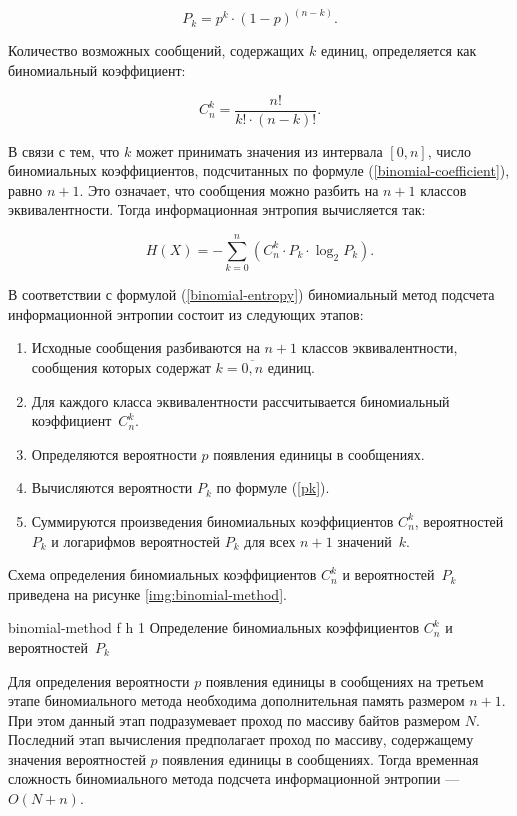 \begin{equation}\label{pk}
	P_{k} = p^k \cdot (1 - p)^{(n - k)}.
\end{equation} 

Количество возможных сообщений, содержащих $k$ единиц, определяется как биномиальный коэффициент:

\begin{equation}\label{binomial-coefficient}
	C_{n}^k = \frac{n!}{k! \cdot (n - k)!}.
\end{equation}

В связи с тем, что $k$ может принимать значения из интервала $[0, n]$, число биномиальных коэффициентов, подсчитанных по формуле (\ref{binomial-coefficient}), равно $n + 1$. Это означает, что сообщения можно разбить на $n + 1$ классов эквивалентности. Тогда информационная энтропия вычисляется так:

\begin{equation}\label{binomial-entropy}
	H(X) = -\sum_{k = 0}^n (C_{n}^k \cdot P_{k} \cdot \log_{2}P_{k}).
\end{equation}

В соответствии с формулой (\ref{binomial-entropy}) биномиальный метод подсчета информационной энтропии состоит из следующих этапов:

\begin{enumerate}
	\item Исходные сообщения разбиваются на $n + 1$ классов эквивалентности, сообщения которых содержат $k = \overline{0, n}$ единиц.
	\item Для каждого класса эквивалентности рассчитывается биномиальный коэффициент~$C_{n}^k$.
	\item Определяются вероятности $p$ появления единицы в сообщениях.
	\item Вычисляются вероятности $P_{k}$ по формуле (\ref{pk}).
	\item Суммируются произведения биномиальных коэффициентов $C_{n}^k$, вероятностей $P_{k}$ и логарифмов вероятностей $P_{k}$ для всех $n + 1$ значений~$k$.
\end{enumerate}

Схема определения биномиальных коэффициентов $C_{n}^k$ и вероятностей~$P_{k}$ приведена на рисунке \ref{img:binomial-method}.

    {binomial-method}
    {f}
    {h}
    {1\textwidth}
    {Определение биномиальных коэффициентов $C_{n}^k$ и вероятностей~$P_{k}$}

Для определения вероятности $p$ появления единицы в сообщениях на третьем этапе биномиального метода необходима дополнительная память размером $n + 1$. При этом данный этап подразумевает проход по массиву байтов размером $N$. Последний этап вычисления предполагает проход по массиву, содержащему значения вероятностей $p$ появления единицы в сообщениях. Тогда временная сложность биномиального метода подсчета информационной энтропии --- $O(N + n)$.

